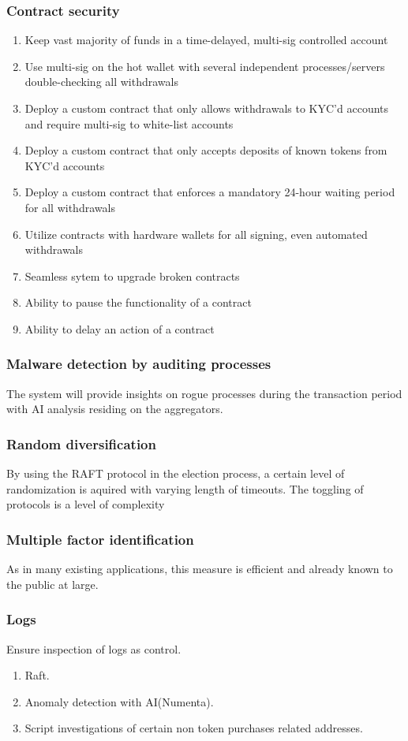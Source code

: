 \documentclass[]{article}
\begin{document}
		\subsubsection{Contract security}
		\begin{enumerate}
		\item Keep vast majority of funds in a time-delayed, multi-sig controlled account
		\item Use multi-sig on the hot wallet with several independent processes/servers double-checking all withdrawals
		\item Deploy a custom contract that only allows withdrawals to KYC'd accounts and require multi-sig to white-list accounts
		\item Deploy a custom contract that only accepts deposits of known tokens from KYC'd accounts
		\item Deploy a custom contract that enforces a mandatory 24-hour waiting period for all withdrawals
		\item Utilize contracts with hardware wallets for all signing, even automated withdrawals
		\item Seamless sytem to upgrade broken contracts
		\item Ability to pause the functionality of a contract 
		\item Ability to delay an action of a contract	
		\end{enumerate}
		\subsubsection{Malware detection by auditing processes}
		The system will provide insights on rogue processes during the transaction period with AI analysis residing on the aggregators. 
		\subsubsection{Random diversification}
		By using the RAFT protocol in the election process, a certain level of randomization is aquired with varying length of timeouts. 
		The toggling of protocols is a level of complexity 
		\subsubsection{Multiple factor identification}
		As in many existing applications, this measure is efficient and already known to the public at large.
		\subsubsection {Logs}
			Ensure inspection of logs as control.
			\begin{enumerate}
				\item Raft.
				\item Anomaly detection with AI(Numenta).
				\item Script investigations of certain non token purchases related addresses.
			\end{enumerate}
\end{document}
